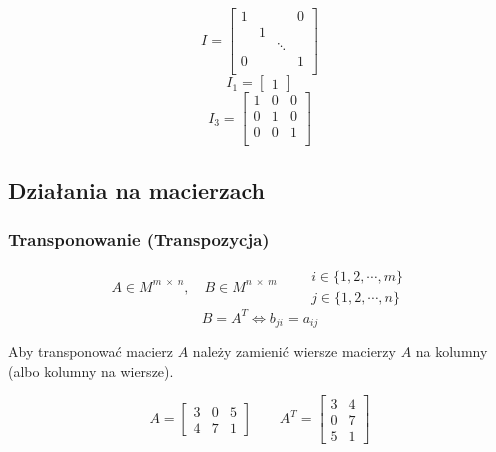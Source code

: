 \documentclass[../Matematyka.tex]{subfiles}
\begin{document}
    \begin{displaymath}
        I =
        \begin{bmatrix}
            1 & &         & 0 \\
            & 1 &         &   \\
            &   & \ddots  &   \\
            0 & &         & 1 \\
        \end{bmatrix}
    \end{displaymath}
    \begin{displaymath}
        I_1 =
        \begin{bmatrix}
            1
        \end{bmatrix}
    \end{displaymath}
    \begin{displaymath}
        I_3 =
        \begin{bmatrix}
            1 & 0 & 0 \\
            0 & 1 & 0 \\
            0 & 0 & 1 \\
        \end{bmatrix}
    \end{displaymath}

    \newpage
    \subsection{Działania na macierzach}

    \subsubsection{Transponowanie (Transpozycja)}
    \begin{displaymath}
        A \in M^{m\;\times\;n},\quad
        B \in M^{n\;\times\;m} \qquad
        \substack
        {
            i \in \{1,2, \cdots,m\}\\
            j \in \{1,2, \cdots,n\}
        }
    \end{displaymath}
    \[B = A^T \iff b_{ji} = a_{ij}\]

    Aby transponować macierz \(A\) należy zamienić wiersze macierzy \(A\) na kolumny (albo kolumny na wiersze).

    \begin{displaymath}
        A = 
        \begin{bmatrix}
            3 & 0 & 5 \\
            4 & 7 & 1
        \end{bmatrix}
        \qquad
        A^T =
        \begin{bmatrix}
            3 & 4 \\
            0 & 7 \\
            5 & 1
        \end{bmatrix}
    \end{displaymath}
\end{document}

